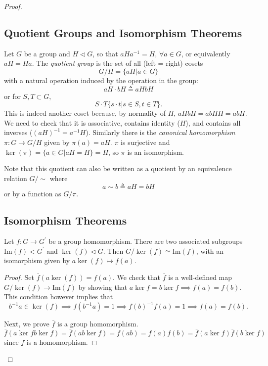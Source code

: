 \begin{proof}
\subsection{Quotient Groups and Isomorphism Theorems}

\begin{defn}
Let $G$ be a group and $H \triangleleft G$, so that $aHa^{-1} = H$,
$\forall a \in G$, or equivalently $aH = Ha$.
The \emph{quotient group} is the set of all (left = right) cosets
$$
G / H = \{ aH | a \in G \}
$$
with a natural operation induced by the operation in the group:
$$
aH \cdot bH \triangleq aHbH
$$
or for $S, T \subset G$,
$$
S \cdot T \{ s \cdot t | s \in S, t \in T \}.
$$
This is indeed another coset because, by normality of $H$,
$aHbH = abHH = abH$. We need to check that it is associative, contains
identity ($H$), and contains all inverses ($(aH)^{-1} = a^{-1}H$).
Similarly there is the
\emph{canonical homomorphism} $\pi : G \to G/H$ given by
$\pi(a) = aH$. $\pi$ is surjective and
$\ker(\pi) = \{ a \in G | aH = H \} = H$, so $\pi$ is an isomorphism.
\end{defn}

Note that this quotient can also be written as a quotient by an
equivalence relation $G/\sim$ where
$$
a \sim b \triangleq aH = bH
$$
or by a function as $G/\pi$.

\subsection{Isomorphism Theorems}

\begin{theorem}
Let $f : G \to G^\prime$ be a group homomorphism. There are two
associated subgroups $\mathrm{Im}(f) < G^\prime$ and
$\ker(f) \triangleleft G$. Then
$G / \ker(f) \simeq \mathrm{Im}(f)$, with an isomorphism given by
$a \ker(f) \mapsto f(a)$.
\end{theorem}
\begin{proof}
Set $\bar{f}(a \ker (f)) = f(a)$. We check that $\bar{f}$ is a
well-defined map $G / \ker(f) \to \mathrm{Im}(f)$ by showing that
$a \ker f = b \ker f \implies f(a) = f(b)$. This condition however
implies that
$$
b^{-1} a \in \ker(f)
  \implies f(b^{-1} a) = 1
  \implies f(b)^{-1} f(a) = 1
  \implies f(a) = f(b).
$$

Next, we prove $\bar{f}$ is a group homomorphism.
$$
\bar{f}(a \ker f b \ker f)
  = \bar{f} (a b \ker f)
  = f(ab)
  = f(a)f(b)
  = \bar{f}(a \ker f) \bar{f}(b \ker f)
$$
since $f$ is a homomorphism.


\end{proof}
\end{proof}
